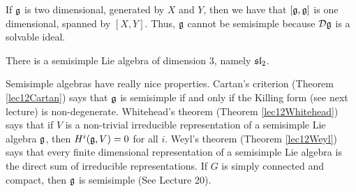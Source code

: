  If $\g$ is two dimensional, generated by $X$ and $Y$, then we have that $[\g,\g]$ is
 one dimensional, spanned by $[X,Y]$. Thus, $\g$ cannot be semisimple because $\D\g$
 is a solvable ideal.

 There is a semisimple Lie algebra of dimension $3$, namely $\sl_2$.

 Semisimple algebras have really nice properties. Cartan's criterion (Theorem
 \ref{lec12Cartan}) says that $\g$ is semisimple if and only if the Killing form (see
 next lecture) is non-degenerate. Whitehead's theorem (Theorem \ref{lec12Whitehead})
 says that if $V$ is a non-trivial irreducible representation of a semisimple Lie
 algebra $\g$, then $H^i(\g,V)=0$ for all $i$. Weyl's theorem (Theorem
 \ref{lec12Weyl}) says that every finite dimensional representation of a semisimple
 Lie algebra is the direct sum of irreducible representations. If $G$ is simply
 connected and compact, then $\g$ is semisimple (See Lecture 20).
